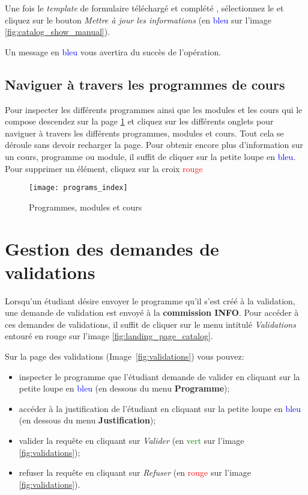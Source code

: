 Une fois le \textit{template} de formulaire téléchargé et complété , sélectionnez le et cliquez sur le bouton \textit{Mettre à jour les informations} (en \textcolor{blue}{bleu} sur l'image \ref{fig:catalog_show_manual}).


Un message en \textcolor{blue}{bleu} vous avertira du succès de l'opération.


\subsection{Naviguer à travers les programmes de cours}

Pour inspecter les différents programmes ainsi que les modules et les cours qui le compose descendez sur la page \ref{fig:programs_index} et cliquez sur les différents onglets pour naviguer à travers les différents programmes, modules et cours. Tout cela se déroule sans devoir recharger la page. Pour obtenir encore plus d'information sur un cours, programme ou module, il suffit de cliquer sur la petite loupe en \textcolor{blue}{bleu}. Pour supprimer un élément, cliquez sur la croix \textcolor{red}{rouge}

\begin{figure}
\centering
\caption{Programmes, modules et cours}
\label{fig:programs_index}
\texttt{[image: programs\_index]}

\end{figure}



\section{Gestion des demandes de validations}
Lorsqu'un étudiant désire envoyer le programme qu'il s'est créé à la validation, une demande de validation est envoyé à la \textbf{commission INFO}. Pour accéder à ces demandes de validations, 
il suffit de cliquer sur le menu intitulé \textit{Validations} entouré en rouge sur l'image \ref{fig:landing_page_catalog}.

Sur la page des validations (Image~\ref{fig:validations}) vous pouvez:
\begin{itemize}
\item inspecter le programme que l'étudiant demande de valider en cliquant sur la petite loupe en \textcolor{blue}{bleu} (en dessous du menu \textbf{Programme});
\item accéder à la justification de l'étudiant en cliquant sur la petite loupe en \textcolor{blue}{bleu} (en dessous du menu \textbf{Justification});
\item valider la requête en cliquant sur \textit{Valider} (en \textcolor{green}{vert} sur l'image \ref{fig:validations});
\item refuser la requête en cliquant sur \textit{Refuser} (en \textcolor{red}{rouge} sur l'image \ref{fig:validations}).
\end{itemize}

